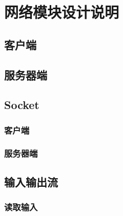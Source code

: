 \documentclass{article}
\begin{document}


\section{网络模块设计说明}
\subsection{客户端}
\subsection{服务器端}
\subsection{Socket}
\subsubsection{客户端}
\subsubsection{服务器端}
\subsection{输入输出流}
\subsubsection{读取输入}
\end{document}
